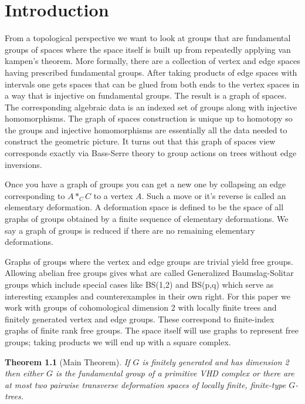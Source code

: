 \documentclass[12pt,parskip=full]{report}
\theoremstyle{plain}
\newtheorem{thm}{Theorem}[section]
\theoremstyle{definition}
\begin{document}


\chapter{Introduction}

From a topological perspective we want to look at groups that are fundamental groups of spaces where the space itself is built up from repeatedly applying van kampen's theorem. More formally, there are a collection of vertex and edge spaces having prescribed fundamental groups. After taking products of edge spaces with intervals one gets spaces that can be glued from both ends to the vertex spaces in a way that is injective on fundamental groups. The result is a graph of spaces. The corresponding algebraic data is an indexed set of groups along with injective homomorphisms. The graph of spaces construction is unique up to homotopy so the groups and injective homomorphisms are essentially all the data needed to construct the geometric picture. It turns out that this graph of spaces view corresponds exactly via Bass-Serre theory to group actions on trees without edge inversions.

Once you have a graph of groups you can get a new one by collapsing an edge corresponding to \(A*_CC\) to a vertex \(A\). Such a move or it's reverse is called an elementary deformation. A deformation space is defined to be the space of all graphs of groups obtained by a finite sequence of elementary deformations. We say a graph of groups is reduced if there are no remaining elementary deformations.

Graphs of groups where the vertex and edge groups are trivial yield free groups. Allowing abelian free groups gives what are called Generalized Baumslag-Solitar groups which include special cases like BS(1,2) and BS(p,q) which serve as interesting examples and counterexamples in their own right. For this paper we work with groups of cohomological dimension 2 with locally finite trees and finitely generated vertex and edge groups. These correspond to finite-index graphs of finite rank free groups. The space itself will use graphs to represent free groups; taking products we will end up with a square complex.

\begin{thm}
    [Main Theorem]
    If \(G\) is finitely generated and has dimension 2 then either \(G\) is the fundamental group of a primitive VHD complex or there are at most two pairwise transverse deformation spaces of locally finite, finite-type \(G\)-trees.
\end{thm}
\end{document}
